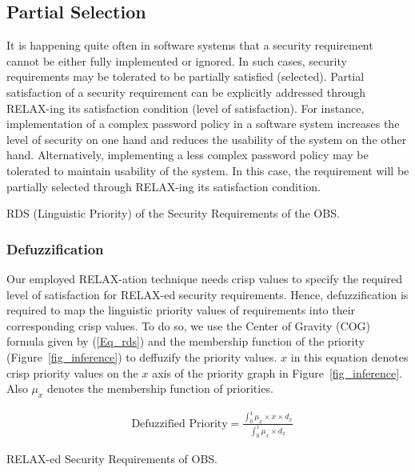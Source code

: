 \subsection{Partial Selection}
\label{pas_partial}

It is happening quite often in software systems that a security requirement cannot be either fully implemented or ignored. In such cases, security requirements may be tolerated \cite{whittle2010relax,cheng2009goal} to be partially satisfied (selected). Partial satisfaction of a security requirement can be explicitly addressed through RELAX-ing \cite{cheng2009goal} its satisfaction condition (level of satisfaction). For instance, implementation of a complex password policy in a software system increases the level of security on one hand and reduces the usability of the system \cite{adams1999users} on the other hand. Alternatively, implementing a less complex password policy may be tolerated to maintain usability of the system. In this case, the requirement will be partially selected through RELAX-ing its satisfaction condition. %

\begin{table*}[t]
	\caption{RDS (Linguistic Priority) of the Security Requirements of the OBS.}
	\label{table_rds}
	\centering
	
\end{table*}

\subsubsection{Defuzzification}
\label{partial_def}

Our employed RELAX-ation technique\cite{mougouei2013goal,mougouei2015partial} needs crisp values to specify the required level of satisfaction for RELAX-ed security requirements. Hence, defuzzification is required to map the linguistic priority values of requirements into their corresponding crisp values. To do so, we use the Center of Gravity (COG) \cite{van2006fast} formula given by (\ref{Eq_rds}) and the membership function of the priority (Figure~\ref{fig_inference}) to deffuzify the priority values. $ x $ in this equation denotes crisp priority values on the $x$ axis of the priority graph in Figure~\ref{fig_inference}. Also $\mu_{x}$ denotes the membership function of priorities. 

\begin{align}
\label{Eq_rds}
& \text{Defuzzified Priority}=\frac{\int_{0}^{1}\mu_{x}\times x\times d_{x}}{\int_{0}^{1}\mu_{x}\times d_{x}}
\end{align}
\vspace{-3em}
\begin{table}[!htbp]
	\caption{RELAX-ed Security Requirements of OBS.}
	\label{table_relaxed}
	\centering
	
\end{table}
\vspace{-2em}
